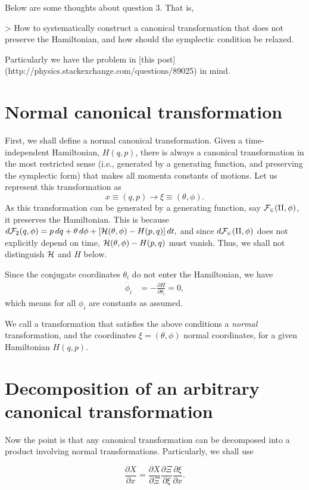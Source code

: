 \documentclass{article}
\begin{document}
Below are some thoughts about question 3.  That is,

> How to systematically construct a canonical transformation that does not preserve the Hamiltonian, and how should the symplectic condition be relaxed.

Particularly we have the problem in [this post](http://physics.stackexchange.com/questions/89025) in mind.

\section{Normal canonical transformation}


First, we shall define a normal canonical transformation. Given a time-independent Hamiltonian, $H(q, p)$,
there is always a canonical transformation in the most restricted sense (i.e., generated by a generating function, and preserving the symplectic form) that makes all momenta constants of motions.
Let us represent this transformation as
$$
x \equiv (q, p) \rightarrow \xi \equiv (\theta, \phi).
$$
As this transformation can be generated by a generating function,
say $\cal F_2(q, \phi)$,
it preserves the Hamiltonian.
This is because
$
d{\cal F}_2(q, \phi) = p \, dq + \theta \, d\phi
+ [{\cal H}(\theta, \phi) - H(p, q)] \, dt,
$
and since $d\cal F_2(q, \phi)$ does not explicitly depend on time,
${\cal H}(\theta, \phi)-H(p, q)$ must vanish.
Thus, we shall not distinguish ${\cal H}$ and $H$ below.

Since the conjugate coordinates $\theta_i$ do not enter the Hamiltonian, we have
\begin{align}
\dot \phi_i  &= -\frac{ \partial H } { \partial \theta_i } = 0,
\end{align}
which means for all $\phi_i$ are constants as assumed.

We call a transformation that satisfies the above conditions a \emph{normal} transformation,
and the coordinates $\xi = (\theta, \phi)$ normal coordinates,
for a given Hamiltonian $H(q, p)$.


\section{Decomposition of an arbitrary canonical transformation}

Now the point is that any canonical transformation can be decomposed into a product involving normal transformations. Particularly, we shall use

$$
\frac{ \partial X }{ \partial x }
=
\frac{ \partial X }{ \partial \Xi }
\frac{ \partial \Xi }{ \partial \xi }
\frac{ \partial \xi }{ \partial x }.
$$
\end{document}
